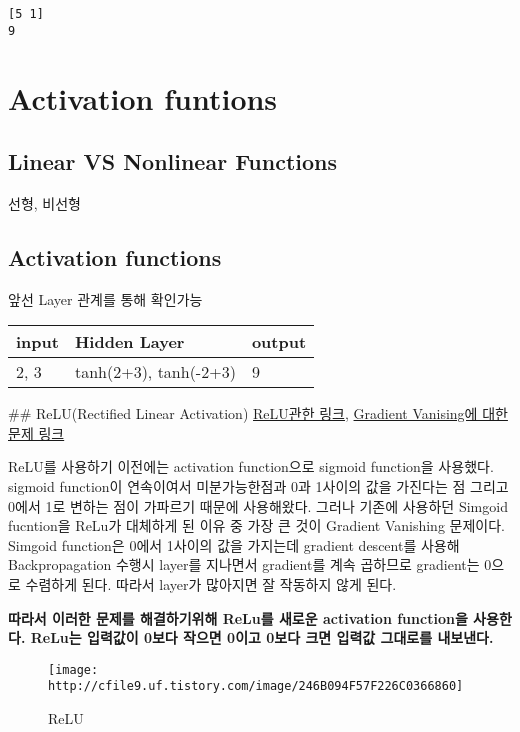 \documentclass[11pt]{article}
\makeatletter
\def\maxwidth{\ifdim\Gin@nat@width>\linewidth\linewidth
    \else\Gin@nat@width\fi}
\let\Oldincludegraphics\includegraphics
\renewcommand{\includegraphics}[1]{\Oldincludegraphics[width=.8\maxwidth]{#1}}
\makeatother
\begin{document}
    \begin{Verbatim}[commandchars=\\\{\}]
[5 1]
9

    \end{Verbatim}

    \section{Activation funtions}\label{activation-funtions}

    \subsection{Linear VS Nonlinear
Functions}\label{linear-vs-nonlinear-functions}

선형, 비선형

    \subsection{Activation functions}\label{activation-functions}

앞선 Layer 관계를 통해 확인가능

\begin{longtable}[]{@{}lll@{}}
\toprule
input & Hidden Layer & output\tabularnewline
\midrule
\endhead
2, 3 & tanh(2+3), tanh(-2+3) & 9\tabularnewline
\bottomrule
\end{longtable}

 \#\# ReLU(Rectified Linear Activation)
\href{http://mongxmongx2.tistory.com/25}{ReLU관한 링크},
\href{http://ydseo.tistory.com/41}{Gradient Vanising에 대한 문제 링크}

    ReLU를 사용하기 이전에는 activation function으로 sigmoid function을
사용했다. sigmoid function이 연속이여서 미분가능한점과 0과 1사이의 값을
가진다는 점 그리고 0에서 1로 변하는 점이 가파르기 때문에 사용해왔다.
그러나 기존에 사용하던 Simgoid fucntion을 ReLu가 대체하게 된 이유 중
가장 큰 것이 {Gradient Vanishing} 문제이다. Simgoid function은 0에서
1사이의 값을 가지는데 gradient descent를 사용해 Backpropagation 수행시
layer를 지나면서 gradient를 계속 곱하므로 gradient는 {0으로 수렴}하게
된다. 따라서 layer가 많아지면 잘 작동하지 않게 된다.

    \textbf{따라서 이러한 문제를 해결하기위해 ReLu를 새로운 activation
function을 사용한다. ReLu는 입력값이 0보다 작으면 0이고 0보다 크면
입력값 그대로를 내보낸다.}

    \begin{figure}
\centering
\texttt{[image: http://cfile9.uf.tistory.com/image/246B094F57F226C0366860]}
\caption{ReLU}
\end{figure}
\end{document}
